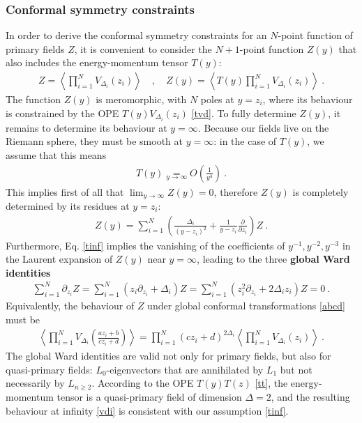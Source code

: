 \documentclass[12pt, a4paper]{article}
\newcommand{\myindex}[1]{\textbf{\boldmath #1}}
\theoremstyle{break}
\begin{document}
\subsubsection{Conformal symmetry constraints}\label{sec:csc}

In order to derive the conformal symmetry constraints for an $N$-point function of primary fields $Z$, it is convenient to consider the $N+1$-point function $Z(y)$ that also includes the energy-momentum tensor $T(y)$:
\begin{align}
 Z = \left< \prod_{i=1}^N V_{\Delta_i}(z_i)\right> \quad , \quad Z(y) = \left< T(y)\prod_{i=1}^N V_{\Delta_i}(z_i)\right>\ .
\end{align}
The function $Z(y)$ is meromorphic, with $N$ poles at $y=z_i$, where its behaviour is constrained by the OPE $T(y)V_{\Delta_i}(z_i)$ \eqref{tvd}. To fully determine $Z(y)$, it remains to determine its behaviour at $y=\infty$. Because our fields live on the Riemann sphere, they must be smooth at $y=\infty$: in the case of $T(y)$, we assume that this means 
\begin{align}
 T(y) \underset{y\to\infty} = O\left(\frac{1}{y^4}\right)\ .
 \label{tinf}
\end{align}
This implies first of all that $\lim_{y\to \infty} Z(y)=0$, therefore $Z(y)$ is completely determined by its residues at $y=z_i$:
\begin{align}
 Z(y) = \sum_{i=1}^N \left(\frac{\Delta_i}{(y-z_i)^2} +\frac{1}{y-z_i}\frac{\partial}{\partial z_i}\right) Z\ .
 \label{zy}
\end{align}
Furthermore, Eq. \eqref{tinf} implies the vanishing of the coefficients of $y^{-1},y^{-2},y^{-3}$ in the Laurent expansion of $Z(y)$ near $y=\infty$, leading to the three \myindex{global Ward identities} 
\begin{align}
 \sum_{i=1}^N \partial_{z_i} Z = \sum_{i=1}^N \left(z_i \partial_{z_i} + \Delta_i\right) Z = \sum_{i=1}^N \left(z_i^2 \partial_{z_i} + 2\Delta_iz_i\right) Z = 0\ .
 \label{gward}
\end{align}
Equivalently, the behaviour of $Z$ under global conformal transformations \eqref{abcd} must be
\begin{align}
 \left< \prod_{i=1}^N  V_{\Delta_i}\left(\frac{az_i+b}{cz_i+d}\right) \right>
 = \prod_{i=1}^N (cz_i +d)^{2\Delta_i} \left< \prod_{i=1}^N V_{\Delta_i}(z_i) \right>\ .
 \label{zgc}
\end{align}
The global Ward identities are valid not only for primary fields, but also for quasi-primary fields: $L_0$-eigenvectors that are annihilated by $L_1$ but not necessarily by $L_{n\geq 2}$. According to the OPE $T(y)T(z)$ \eqref{tt}, the energy-momentum tensor is a quasi-primary field of dimension $\Delta=2$, and the resulting behaviour at infinity \eqref{vdi} is consistent with our assumption \eqref{tinf}. 
\end{document}
